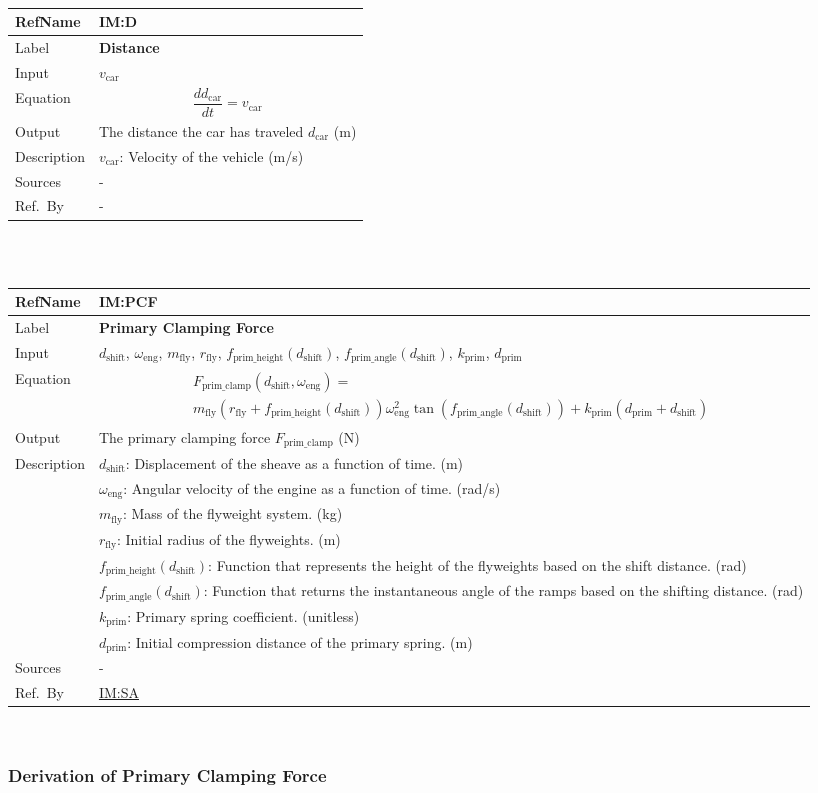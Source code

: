 \documentclass[12pt]{article}
\newcommand{\colAwidth}{0.13\textwidth}
\newcommand{\colBwidth}{0.82\textwidth}
\newcommand{\hpref}[1]{\hyperref[#1]{#1}}
\newcommand{\definstance}[8] {
~\newline
\noindent
\begin{minipage}{\textwidth}
\renewcommand*{\arraystretch}{1.5}
\begin{tabular}{| p{\colAwidth} | p{\colBwidth}|}
  \hline
  \rowcolor[gray]{0.9}
  RefName& \textbf{#1} \label{#1}\\
  \hline
  Label& \bf #2 \\
  \hline
  Input& #3\\
  \hline
  Equation& #4\\
  \hline
  Output& #5\\
  \hline
  Description& #6 \\
  \hline
  Sources& #7 \\
  \hline
  Ref.\ By & #8\\
  \hline
\end{tabular}
\end{minipage}\\
}
\begin{document}
\definstance
{IM:D}
{Distance}
{$v_\text{car}$}
{\[
\frac{dd_\text{car}}{dt} = v_\text{car}
\]}
{The distance the car has traveled $d_\text{car}$ (m)}
{$v_\text{car}$: Velocity of the vehicle (m/s)}
{-}
{-}

\definstance
{IM:PCF}
{Primary Clamping Force}
{$d_{\text{shift}}$, $\omega_\text{eng}$, $m_\text{fly}$, $r_{\text{fly}}$, $f_{\text{prim\_height}}(d_{\text{shift}})$, $f_{\text{prim\_angle}}(d_{\text{shift}})$, $k_{\text{prim}}$, $d_{\text{prim}}$} %
{
  \begin{multline*}
  F_{\text{prim\_clamp}}(d_\text{shift}, \omega_\text{eng}) = \\
  m_\text{fly} (r_{\text{fly}} + f_{\text{prim\_height}}(d_\text{shift}))
  \omega_\text{eng}^2 \tan(f_{\text{prim\_angle}}(d_\text{shift}))
  + k_{\text{prim}} (d_{\text{prim}} + d_\text{shift})
  \end{multline*}
  }
{The primary clamping force $F_{\text{prim\_clamp}}$ (N)}
{
  $d_\text{shift}$: Displacement of the sheave as a function of time. (m)\\
  &$\omega_\text{eng}$: Angular velocity of the engine as a function of time. (rad/s)\\
  &$m_\text{fly}$: Mass of the flyweight system. (kg) \\ 
  &$r_{\text{fly}}$: Initial radius of the flyweights. (m) \\ 
  &$f_{\text{prim\_height}}(d_{\text{shift}})$: Function that represents the height of the flyweights based on the shift distance. (rad) \\
  &$f_{\text{prim\_angle}}(d_{\text{shift}})$: Function that returns the instantaneous angle of the ramps based on the shifting distance. (rad) \\ 
  &$k_{\text{prim}}$: Primary spring coefficient. (unitless) \\ 
  &$d_{\text{prim}}$: Initial compression distance of the primary spring. (m)
} %
{-} %
{\hpref{IM:SA}}

\subsubsection*{Derivation of Primary Clamping Force}
\end{document}
